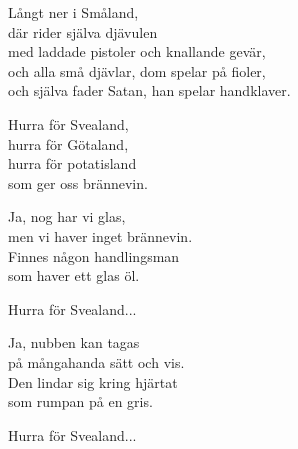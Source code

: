 \vspace{10pt}
Långt ner i Småland,\\
där rider själva djävulen\\
med laddade pistoler och knallande gevär,\\
och alla små djävlar, dom spelar på fioler,\\
och själva fader Satan, han spelar handklaver.\par
\vspace{10pt}
Hurra för Svealand,\\
hurra för Götaland,\\
hurra för potatisland\\
som ger oss brännevin.\par
\vspace{10pt}
Ja, nog har vi glas,\\
men vi haver inget brännevin.\\
Finnes någon handlingsman\\
som haver ett glas öl.\par
\vspace{10pt}
Hurra för Svealand...\par
\vspace{10pt}
Ja, nubben kan tagas\\
på mångahanda sätt och vis.\\
Den lindar sig kring hjärtat\\
som rumpan på en gris.\par
\vspace{10pt}
Hurra för Svealand...
